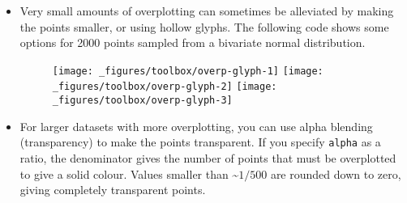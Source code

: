 \begin{itemize}
\item
  Very small amounts of overplotting can sometimes be alleviated by
  making the points smaller, or using hollow glyphs. The following code
  shows some options for 2000 points sampled from a bivariate normal
  distribution. 

\begin{Shaded}
\begin{Highlighting}[]
\StringTok{ }\NormalTok{(} \NormalTok{(}\NormalTok{), } \NormalTok{(}\NormalTok{))}
\StringTok{ }\OperatorTok{+}\StringTok{ }\NormalTok{(}\NormalTok{) }\OperatorTok{+}\StringTok{ }\NormalTok{(}\NormalTok{)}
\OperatorTok{+}\StringTok{ }\NormalTok{()}
\OperatorTok{+}\StringTok{ }\NormalTok{(} \NormalTok{) }
\OperatorTok{+}\StringTok{ }\NormalTok{(} \NormalTok{) }
\end{Highlighting}
\end{Shaded}

  \begin{figure}[H]
    \texttt{[image: \_figures/toolbox/overp-glyph-1]}%
    \texttt{[image: \_figures/toolbox/overp-glyph-2]}%
    \texttt{[image: \_figures/toolbox/overp-glyph-3]}
  \end{figure}
\item
  For larger datasets with more overplotting, you can use alpha blending
  (transparency) to make the points transparent. If you specify
  \texttt{alpha} as a ratio, the denominator gives the number of points
  that must be overplotted to give a solid colour. Values smaller than
  \textasciitilde{}\(1/500\) are rounded down to zero, giving completely
  transparent points.  
   

\begin{Shaded}
\begin{Highlighting}[]
\OperatorTok{+}\StringTok{ }\NormalTok{(}  \OperatorTok{/}\StringTok{ }\NormalTok{)}
\OperatorTok{+}\StringTok{ }\NormalTok{(}  \OperatorTok{/}\StringTok{ }\NormalTok{)}
\OperatorTok{+}\StringTok{ }\NormalTok{(}  \OperatorTok{/}\StringTok{ }\NormalTok{)}
\end{Highlighting}
\end{Shaded}


\end{itemize}
